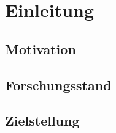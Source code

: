 \section{Einleitung}
\label{einleitung}

\subsection{Motivation}
\label{einleitung:motivation}

\subsection{Forschungsstand}
\label{einleitung:forschung}

\subsection{Zielstellung}
\label{einleitung:zielstellung}

